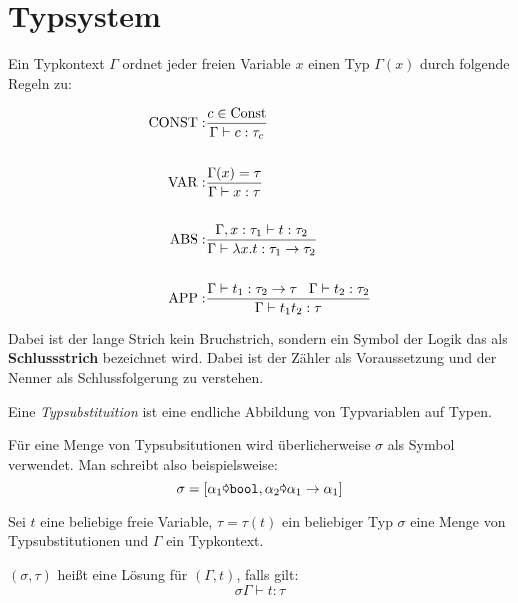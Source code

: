 \section{Typsystem}
\begin{definition}\label{def:typsystem-t1}%
	Ein Typkontext $\Gamma$ ordnet jeder freien Variable $x$ einen Typ $\Gamma(x)$
	durch folgende Regeln zu:

	\begin{align*}
		\operatorname{CONST}:&\frac{c \in \text{Const}}{\Gamma \vdash c: \tau_c}\\
			   &\\
		\operatorname{VAR}:  &\frac{\Gamma(x) = \tau}{\Gamma \vdash x: \tau}\\
			   &\\
		\operatorname{ABS}:  &\frac{\Gamma, x: \tau_1 \vdash t: \tau_2}{\Gamma \vdash \lambda x. t: \tau_1 \rightarrow \tau_2}\\
			   &\\
		\operatorname{APP}:  &\frac{\Gamma \vdash t_1: \tau_2 \rightarrow \tau\;\;\; \Gamma \vdash t_2: \tau_2}{\Gamma \vdash t_1 t_2: \tau} \\
	\end{align*}
\end{definition}


Dabei ist der lange Strich kein Bruchstrich, sondern ein Symbol der Logik das als
\textbf{Schlussstrich} bezeichnet wird. Dabei ist der 
Zähler als Voraussetzung und der Nenner als Schlussfolgerung zu verstehen.

\begin{definition}[Typsubstituition]%
	Eine \textit{Typsubstituition} ist eine endliche Abbildung von Typvariablen auf
	Typen.
\end{definition}

Für eine Menge von Typsubsitutionen wird überlicherweise $\sigma$ als Symbol
verwendet. Man schreibt also beispielsweise:
\[\sigma = [\alpha_1 \text{\pointer} \text{\texttt{bool}}, \alpha_2 \text{\pointer} \alpha_1 \rightarrow \alpha_1]\]

\begin{definition}
	Sei $t$ eine beliebige freie Variable, $\tau = \tau(t)$ ein beliebiger Typ
	$\sigma$ eine Menge von Typsubstitutionen und $\Gamma$ ein Typkontext.

	$(\sigma, \tau)$ heißt eine Lösung für $(\Gamma, t)$, falls gilt:
	\[\sigma \Gamma \vdash t : \tau\]
\end{definition}

